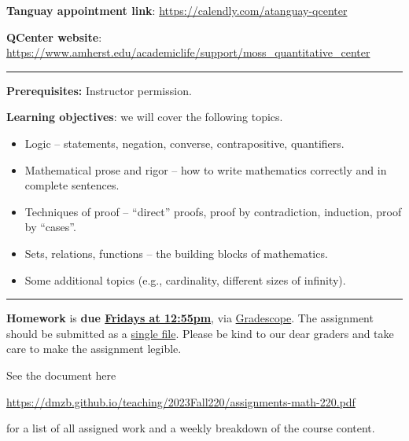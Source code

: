 \documentclass[12pt]{article}
\begin{document}
\noindent\textbf{Tanguay appointment link}: \url{https://calendly.com/atanguay-qcenter}
\medskip

\noindent\textbf{QCenter website}: \url{https://www.amherst.edu/academiclife/support/moss_quantitative_center}

\medskip \hrule \medskip

\noindent\textbf{Prerequisites:} Instructor permission.
\smallskip

\noindent \textbf{Learning objectives}: we will cover the following topics.

\begin{itemize}
\item Logic -- statements, negation, converse, contrapositive, quantifiers. \vspace{-5pt}
\item Mathematical prose and rigor -- how to write mathematics
 correctly and in complete sentences.\vspace{-5pt}
\item Techniques of proof -- ``direct'' proofs, proof by contradiction, induction, proof by ``cases''. \vspace{-5pt}
\item Sets, relations, functions -- the building blocks of mathematics. \vspace{-5pt}
\item Some additional topics (e.g., cardinality, different sizes of infinity).
\end{itemize}

\smallskip \hrule \medskip

\noindent \textbf{Homework} is \textbf{due \underline{Fridays at 12:55pm}}, via \underline{Gradescope}. The assignment should be submitted as a \underline{single file}. Please be kind to our dear graders and take care to make the assignment legible.
\smallskip

\noindent See the document here
\begin{center}
 \url{https://dmzb.github.io/teaching/2023Fall220/assignments-math-220.pdf}
\end{center}
for a list of all assigned work and a weekly breakdown of the course content.
\medskip
\end{document}
